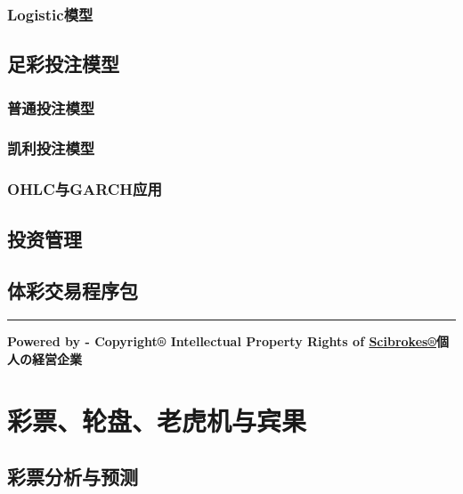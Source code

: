 \documentclass[]{book}
\theoremstyle{definition}
\theoremstyle{definition}
\theoremstyle{definition}
\theoremstyle{remark}
\begin{document}
\hypertarget{logistic}{%
\subsection{Logistic模型}\label{logistic}}

\hypertarget{section-1}{%
\subsection{}\label{section-1}}

\section{足彩投注模型}

\subsection{普通投注模型}

\subsection{凯利投注模型}

\hypertarget{ohlcgarch}{%
\subsection{OHLC与GARCH应用}\label{ohlcgarch}}

\hypertarget{-1}{%
\section{投资管理}\label{-1}}

\section{体彩交易程序包}

\begin{center}\rule{0.5\linewidth}{\linethickness}\end{center}

\textbf{Powered by - Copyright® Intellectual Property Rights of
\href{http://www.scibrokes.com}{Scibrokes®}個人の経営企業}

\hypertarget{lottery}{%
\chapter{彩票、轮盘、老虎机与宾果}\label{lottery}}

\section{彩票分析与预测}
\end{document}
